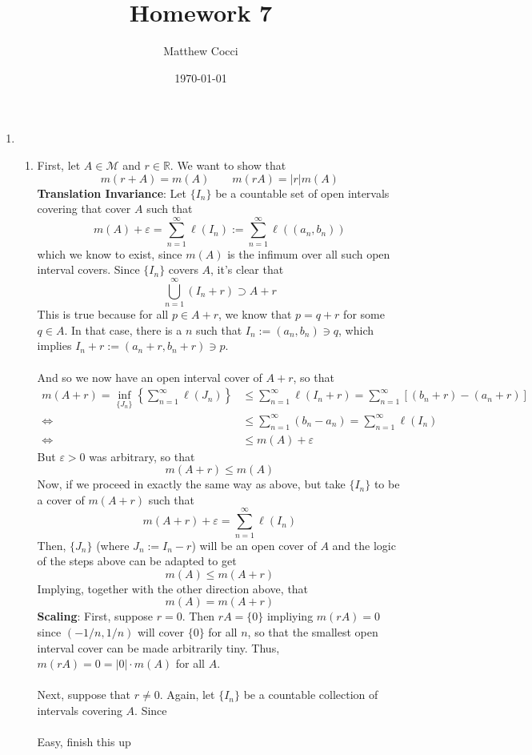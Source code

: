 \documentclass[12pt]{article}
\author{Matthew Cocci}
\title{\textbf{Homework 7}}
\date{\today}
\theoremstyle{plain}
\theoremstyle{definition}
\theoremstyle{remark}
\begin{document}
\maketitle 

\begin{enumerate} 

\item 
    
\begin{enumerate} 

\item 
First, let $A\in\mathscr{M}$ and $r\in\mathbb{R}$. We want to show that 
\[
    m(r+A) = m(A) \qquad m(rA) = |r|m(A)
\]
\textbf{Translation Invariance}: Let $\{I_n\}$ be a countable set of open intervals covering that cover $A$ such that
\[
    m(A) + \varepsilon = \sum^\infty_{n=1} \ell(I_n) := 
    \sum^\infty_{n=1} \ell((a_n, b_n))
\]
which we know to exist, since $m(A)$ is the infimum over all such open interval covers. Since $\{I_n\}$ covers $A$, it's clear that
\[
    \bigcup^\infty_{n=1} (I_n + r) \supset A+r
\]
This is true because for all $p\in A+r$, we know that $p=q+r$ for some $q\in A$. In that case, there is a $n$ such that $I_n:=(a_n,b_n)\ni q$, which implies $I_n + r := (a_n+r, b_n+r) \ni p$.
\\
\\
And so we now have an open interval cover of $A+r$, so that 
\begin{align*}
    m(A+r) = \inf_{\{J_n\}}
        \left\{\sum^\infty_{n=1} \ell(J_n)\right\}
        &\leq \sum^\infty_{n=1} \ell(I_n + r) 
        = \sum^\infty_{n=1} [(b_n+r)-(a_n+r)] \\
    \Leftrightarrow \qquad
        &\leq \sum^\infty_{n=1} (b_n-a_n) 
        = \sum^\infty_{n=1} \ell(I_n) \\
    \Leftrightarrow \qquad
        &\leq m(A) + \varepsilon
\end{align*}
But $\varepsilon>0$ was arbitrary, so that 
\begin{equation}
    m(A+r) \leq m(A) 
\end{equation}
Now, if we proceed in exactly the same way as above, but take $\{I_n\}$ to be a cover of $m(A+r)$ such that 
\[
    m(A + r) + \varepsilon = \sum^\infty_{n=1} \ell(I_n) 
\]
Then, $\{J_n\}$ (where $J_n:=I_n-r$) will be an open cover of $A$ and the logic of the steps above can be adapted to get
\begin{equation}
    m(A) \leq m(A+r)
\end{equation}
Implying, together with the other direction above, that 
\[
    m(A) = m(A+r)
\]
\textbf{Scaling}: First, suppose $r=0$. Then $rA=\{0\}$ impliying $m(rA)=0$ since $(-1/n, 1/n)$ will cover $\{0\}$ for all $n$, so that the smallest open interval cover can be made arbitrarily tiny. Thus, $m(rA)=0=|0|\cdot m(A)$ for all $A$.
\\
\\
Next, suppose that $r\neq 0$. Again, let $\{I_n\}$ be a countable collection of intervals covering $A$. Since 
\\
\\
Easy, finish this up


\end{enumerate}
\end{enumerate}
\end{document}
